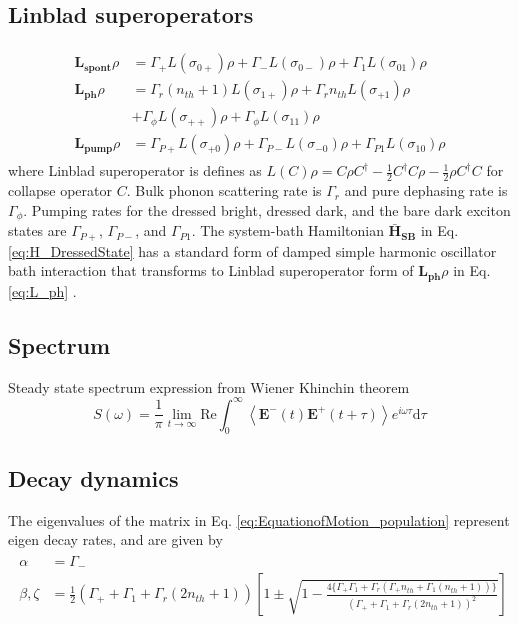 \documentclass[aps,pra,preprint,groupedaddress]{revtex4-1}
\begin{document}
\subsection{Linblad superoperators}
\label{appendix:Linblad}
\begin{eqnarray}
\begin{aligned}
\label{eq:L_spont}
\mathbf{L_{spont}}\rho &= \Gamma_+ L(\sigma_{0+})\rho+\Gamma_- L(\sigma_{0-})\rho+\Gamma_1 L(\sigma_{01})\rho\\
\label{eq:L_ph}
\mathbf{L_{ph}}\rho &= \Gamma_r(n_{th}+1) L(\sigma_{1+})\rho+\Gamma_r n_{th} L(\sigma_{+1})\rho\\
&+\Gamma_\phi L(\sigma_{++})\rho+\Gamma_\phi L(\sigma_{11})\rho\\
\label{eq:L_pump}
\mathbf{L_{pump}}\rho &= \Gamma_{P+}L(\sigma_{+0})\rho+\Gamma_{P-}L(\sigma_{-0})\rho+\Gamma_{P1}L(\sigma_{10})\rho
\end{aligned}
\end{eqnarray}
where Linblad superoperator is defines as $L(C)\rho = C\rho C^\dagger - \frac{1}{2}C^\dagger C\rho - \frac{1}{2}\rho C^\dagger C$ for collapse operator $C$. Bulk phonon scattering rate is $\Gamma_r$ and pure dephasing rate is $\Gamma_{\phi}$. Pumping rates for the dressed bright, dressed dark, and the bare dark exciton states are $\Gamma_{P+}$, $\Gamma_{P-}$, and $\Gamma_{P1}$. The system-bath Hamiltonian $\mathbf{\bar{H}_{SB}}$ in Eq. \ref{eq:H_DressedState} has a standard form of damped simple harmonic oscillator bath interaction that transforms to Linblad superoperator form of $\mathbf{L_{ph}}\rho$ in Eq. \ref{eq:L_ph} \cite{WallsMilburn2007,Majumdar2011}.

\subsection{Spectrum} 
\label{appendix:Spectrum}
Steady state spectrum expression from Wiener Khinchin theorem \cite{Scully1997}
\begin{equation}
\label{eq:WeinerKhinchin}
S(\omega)=\frac{1}{\pi}\lim_{t \to \infty} \text{Re} \int_0^\infty \! \left< \mathbf{E^{-}}(t)\mathbf{E^+}(t+\tau)\right>e^{i\omega\tau}\mathrm{d}\tau 
\end{equation}

\subsection{Decay dynamics} 
\label{appendix:DecayDynamics}
The eigenvalues of the matrix in Eq. \ref{eq:EquationofMotion_population} represent eigen decay rates, and are given by
\begin{eqnarray}
\begin{aligned}
\label{eq:EigenValues_DecayRate}
\alpha &=\Gamma_- \\
\beta, \zeta &=\frac{1}{2}(\Gamma_++\Gamma_1+\Gamma_r(2n_{th}+1))[1\pm\sqrt{1-\frac{4\{\Gamma_+\Gamma_1+\Gamma_r(\Gamma_+n_{th}+\Gamma_1(n_{th}+1))\}}{(\Gamma_++\Gamma_1+\Gamma_r(2n_{th}+1))^2}}]     \\
\end{aligned}
\end{eqnarray}
\end{document}
